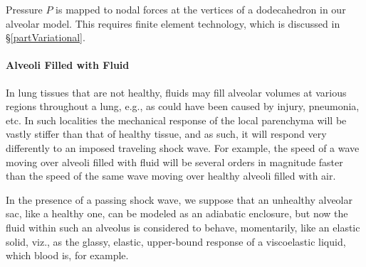 Pressure $P$ is mapped to nodal forces at the vertices of a dodecahedron in our alveolar model.  This requires finite element technology, which is discussed in \S\ref{partVariational}.

\paragraph{Alveoli Filled with Fluid}

In lung tissues that are not healthy, fluids may fill alveolar volumes at various regions throughout a lung, e.g., as could have been caused by injury, pneumonia, etc.  In such localities the mechanical response of the local parenchyma will be vastly stiffer than that of healthy tissue, and as such, it will respond very differently to an imposed traveling shock wave.  For example, the speed of a wave moving over alveoli filled with fluid will be several orders in magnitude faster than the speed of the same wave moving over healthy alveoli filled with air.

In the presence of a passing shock wave, we suppose that an unhealthy alveolar sac, like a healthy one, can be modeled as an adiabatic enclosure, but now the fluid within such an alveolus is considered to behave, momentarily, like an elastic solid, viz., as the glassy, elastic, upper-bound response of a visco\-elastic liquid, which blood is, for example.

